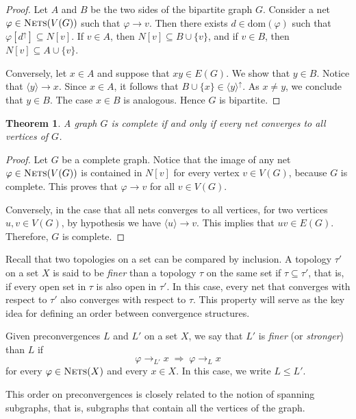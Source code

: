 \documentclass{amsart}
\newtheorem{theorem}{Theorem}[section]
\theoremstyle{definition}
\theoremstyle{remark}
\numberwithin{equation}{section}
\begin{document}
\begin{proof}
	Let $A$ and $B$ be the two sides of the bipartite graph $G$. 
	Consider a net $\varphi\in\textsc{Nets}(V(G))$ such that $\varphi\to v$. 
	Then there exists $d\in\mathrm{dom}(\varphi)$ such that 
	$\varphi[d^\uparrow]\subseteq N[v]$. 
	If $v\in A$, then $N[v]\subseteq B\cup\{v\}$, and if $v\in B$, then 
	$N[v]\subseteq A\cup\{v\}$.
	
	Conversely, let $x\in A$ and suppose that $xy\in E(G)$. 
	We show that $y\in B$. Notice that $\langle y\rangle\to x$. 
	Since $x\in A$, it follows that $B\cup\{x\}\in\langle y\rangle^\uparrow$. 
	As $x\neq y$, we conclude that $y\in B$. 
	The case $x\in B$ is analogous. Hence $G$ is bipartite.
\end{proof}

\begin{theorem}
	A graph $G$ is complete if and only if every net converges to all vertices of $G$.
\end{theorem}

\begin{proof}
	Let $G$ be a complete graph. Notice that the image of any net $\varphi\in\textsc{Nets}(V(G))$ is contained in $N[v]$ for every vertex $v \in V(G)$, because $G$ is complete. This proves that $\varphi \to v$ for all $v \in V(G)$.
	
	
	Conversely, in the case that all nets converges to all vertices, for two vertices $u, v \in V(G)$, by hypothesis we have $\langle u \rangle \to v$. This implies that $uv \in E(G)$. Therefore, $G$ is complete.
\end{proof}
Recall that two topologies on a set can be compared by inclusion. 
A topology $\tau'$ on a set $X$ is said to be \emph{finer} than a topology $\tau$ on the same set if $\tau \subseteq \tau'$, that is, if every open set in $\tau$ is also open in $\tau'$.
In this case, every net that converges with respect to $\tau'$ also converges with respect to $\tau$. 
This property will serve as the key idea for defining an order between convergence structures.

Given preconvergences $L$ and $L'$ on a set $X$, we say that $L'$ is \emph{finer} (or \emph{stronger}) than $L$ if
\[
\varphi \to_{L'} x \;\Rightarrow\; \varphi \to_{L} x
\]
for every $\varphi \in \textsc{Nets}(X)$ and every $x \in X$. In this case, we write $L \le L'$.

This order on preconvergences is closely related to the notion of spanning subgraphs, that is, subgraphs that contain all the vertices of the graph.
\end{document}
